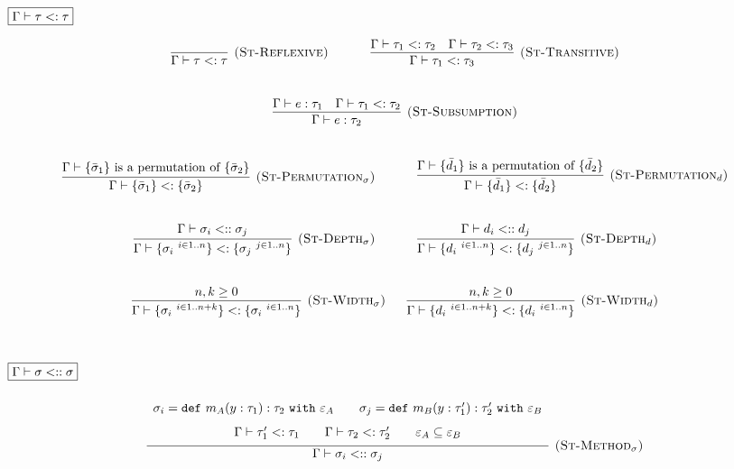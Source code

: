 \documentclass{llncs}
\newcommand{\keywadj}[1]{\mathtt{#1}}
\newcommand{\keyw}[1]{\keywadj{#1}~}
\newcommand{\kw}[1]{\keyw{ #1 }}
\newcommand{\type}[2]{
	#1~\keyw{with} #2
}
\begin{document}
\noindent
$\fbox{$\Gamma \vdash \tau <: \tau$}$

\[
\begin{array}{c}

\infer[\textsc{(St-Reflexive)}]
	{\Gamma \vdash \tau <: \tau}
	{}
	
~~~~~~~~~~

	\infer[\textsc{(St-Transitive)}]
	{\Gamma \vdash \tau_1 <: \tau_3}
	{\Gamma \vdash \tau_1 <: \tau_2 & \Gamma \vdash \tau_2 <: \tau_3}\\[5ex]

\infer[\textsc{(St-Subsumption)}]
	{\Gamma \vdash e : \tau_2}
	{\Gamma \vdash e : \tau_1 & \Gamma \vdash \tau_1 <: \tau_2} \\[5ex]
	
\infer[\textsc{(St-Permutation$_\sigma$)}]
	{\Gamma \vdash \{ \bar \sigma_1 \} <: \{ \bar \sigma_2 \} }
	{\Gamma \vdash \{ \bar \sigma_1 \} $ is a permutation of $ \{ \bar \sigma_2 \}}
	
	~~~~~~~~~~
	
\infer[\textsc{(St-Permutation$_d$)}]
	{\Gamma \vdash \{ \bar d_1 \} <: \{ \bar d_2 \} }
	{\Gamma \vdash \{ \bar d_1 \} $ is a permutation of $ \{ \bar d_2 \}}
	
	\\[5ex]
	
\infer[\textsc{(St-Depth$_\sigma$)}]
	{ \Gamma \vdash \{ \sigma_i~^{i \in 1..n} \} <: \{ \sigma_j~^{j \in 1..n} \} }
	{ \Gamma \vdash \sigma_i <:: \sigma_j }
	
	~~~~~~~~~~
	
\infer[\textsc{(St-Depth$_d$)}]
	{ \Gamma \vdash \{ d_i~^{i \in 1..n} \} <: \{ d_j~^{j \in 1..n} \} }
	{ \Gamma \vdash d_i <:: d_j }
	
	\\[5ex]
	
\infer[\textsc{(St-Width$_\sigma$)}]
	{ \Gamma \vdash \{ \sigma_i~^{i \in 1..n+k} \} <: \{ \sigma_i~^{i \in 1..n} \} }
	{n,k \geq 0}
	
~~~~~
  
\infer[\textsc{(St-Width$_d$)}]
	{ \Gamma \vdash \{ d_i~^{i \in 1..n+k} \} <: \{ d_i~^{i \in 1..n} \} }
	{n,k \geq 0}
	
		\\[5ex]
	
	
\end{array}
\]


\noindent
$\fbox{$\Gamma \vdash \sigma <:: \sigma$}$

\[
\begin{array}{c}

\infer[\textsc{(St-Method$_\sigma$)}]
	{ \Gamma \vdash \sigma_i <:: \sigma_j }
{{\def\arraystretch{1.6}
  \begin{array}{c}
\sigma_i = \kw{def} m_A(y : \tau_1) : \type{\tau_2}{\varepsilon_A}
~~~~~~\sigma_j = \kw{def} m_B(y : \tau_1') : \type{\tau_2'}{\varepsilon_B} \\
\Gamma \vdash \tau_1' <: \tau_1 ~~~~~~ \Gamma \vdash \tau_2 <: \tau_2' ~~~~~~ \varepsilon_A \subseteq \varepsilon_B
  \end{array}}} \\[5ex]
 
\end{array}
\]
\end{document}
